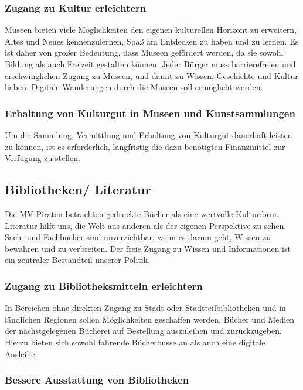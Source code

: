 \subsubsection{Zugang zu Kultur erleichtern}

Museen bieten viele Möglichkeiten den eigenen kulturellen Horizont zu erweitern, Altes und Neues kennenzulernen, Spaß am Entdecken zu haben und zu lernen. Es ist daher von großer Bedeutung, dass Museen gefördert werden, da sie sowohl Bildung als auch Freizeit gestalten können. Jeder Bürger muss barrierefreien und erschwinglichen Zugang zu Museen, und damit zu Wissen, Geschichte und Kultur haben. Digitale Wanderungen durch die Museen soll ermöglicht werden.

\subsubsection{Erhaltung von Kulturgut in Museen und Kunstsammlungen}

Um die Sammlung, Vermittlung und Erhaltung von Kulturgut dauerhaft leisten zu können, ist es erforderlich, langfristig die dazu benötigten Finanzmittel zur Verfügung zu stellen.

\subsection{Bibliotheken/ Literatur}

Die MV-Piraten betrachten gedruckte Bücher als eine wertvolle Kulturform. Literatur hilft uns, die Welt aus anderen als der eigenen Perspektive zu sehen. Sach- und Fachbücher sind unverzichtbar, wenn es darum geht, Wissen zu bewahren und zu verbreiten. Der freie Zugang zu Wissen und Informationen ist ein zentraler Bestandteil unserer Politik.

\subsubsection{Zugang zu Bibliotheksmitteln erleichtern}

In Bereichen ohne direkten Zugang zu Stadt oder Stadtteilbibliotheken und in ländlichen Regionen sollen Möglichkeiten geschaffen werden, Bücher und Medien der nächstgelegenen Bücherei auf Bestellung auszuleihen und zurückzugeben. Hierzu bieten sich sowohl fahrende Bücherbusse an als auch eine digitale Ausleihe.

\subsubsection{Bessere Ausstattung von Bibliotheken}


